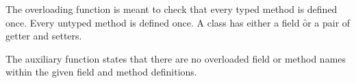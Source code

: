 \documentclass[a4paper,USenglish]{tex/lipics-v2016}
\begin{document}
The overloading function is meant to check that every typed method is
defined once. Every untyped method is defined once. A class has either a
field \f or a pair of getter and setters. \\


\begin{mathpar}
\end{mathpar}


\begin{mathpar}
\end{mathpar}

The  auxiliary function states that there are no overloaded 
field or method names within the given field and method definitions. \\

\begin{mathpar}



\end{mathpar}

\begin{mathpar}
\end{mathpar}
\end{document}
